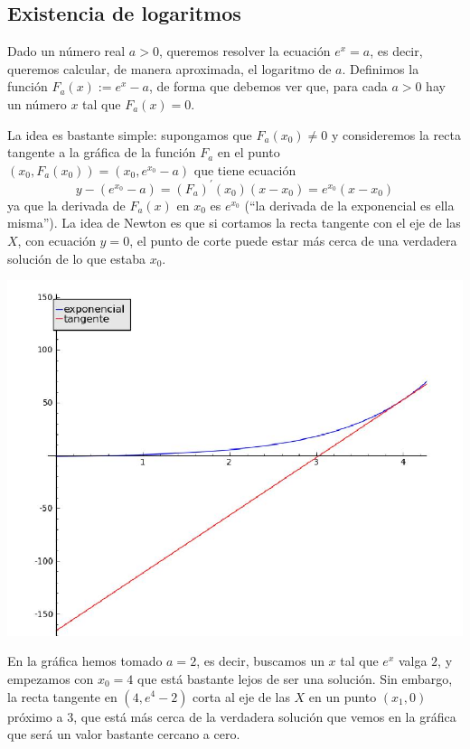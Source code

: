 \subsection{Existencia de logaritmos}

Dado un n\'umero real $a>0$, queremos  resolver la ecuaci\'on $e^x=a$, es decir,
queremos calcular, de manera aproximada,  el logaritmo de $a$. Definimos la
funci\'on
$F_a(x):=e^x-a$, de forma que debemos ver que, para cada $a>0$ hay un n\'umero
$x$ tal que $F_a(x)=0$.

La idea es bastante simple: supongamos que $F_a(x_0)\ne 0$ y consideremos la
recta tangente a la gr\'afica de la funci\'on $F_a$ en el punto
$(x_0,F_a(x_0))=(x_0,e^{x_0}-a)$ que tiene ecuaci\'on 
\[y-(e^{x_0}-a)=(F_a)^{\prime}(x_0)(x-x_0)=e^{x_0}(x-x_0)\]
\noindent ya que la derivada de $F_a(x)$ en $x_0$ es $e^{x_0}$ (``la derivada de
la exponencial es ella misma''). La idea de Newton es que si cortamos la recta
tangente con el eje de las $X$, con ecuaci\'on $y=0$, el punto de corte puede
estar m\'as cerca de una verdadera soluci\'on de lo que estaba $x_0$. 

\begin{center}
 \includegraphics[scale=0.3]{imagenes/graf_exp2}
\end{center}

En la gr\'afica hemos tomado $a=2$, es decir, buscamos un $x$ tal que $e^x$
valga $2$, y empezamos con $x_0=4$ que est\'a bastante lejos de ser una
soluci\'on.  Sin embargo, la recta tangente en $(4,e^4-2)$ corta al eje de las
$X$ en un punto $(x_1,0)$ pr\'oximo a $3$,  que est\'a m\'as cerca de la
verdadera soluci\'on que vemos en la gr\'afica que ser\'a un valor bastante
cercano a cero. 


